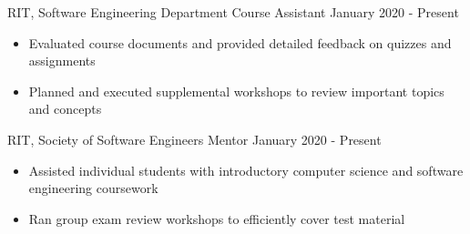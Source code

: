 \documentclass{awesome-cv}
\begin{document}
\begin{cventries}
		
		\end{cventries}
	\vspace{-0.1cm}
		\begin{cventries}
			\vspace{-0.1cm}
			
			\cventry
				{RIT, Software Engineering Department}
				{Course Assistant\small{\textnormal{\color{graytext}{, Introduction to Software Engineering}}}}
				{January 2020 - Present}
				{}
				{
					\vspace{-0.3cm}
					\begin{itemize}[nosep]
						\item Evaluated course documents and provided detailed feedback on quizzes and assignments
						\item Planned and executed supplemental workshops to review important topics and concepts
					\end{itemize}
					\vspace{-0.5cm}
				}
				
			\cventry
				{RIT, Society of Software Engineers}
				{Mentor}
				{January 2020 - Present}
				{}
				{
					\vspace{-0.3cm}
					\begin{itemize}[nosep]
						\item Assisted individual students with introductory computer science and software engineering coursework
						\item Ran group exam review workshops to efficiently cover test material
					\end{itemize}
					\vspace{-0.5cm}
				}	
		\end{cventries}
\end{document}
